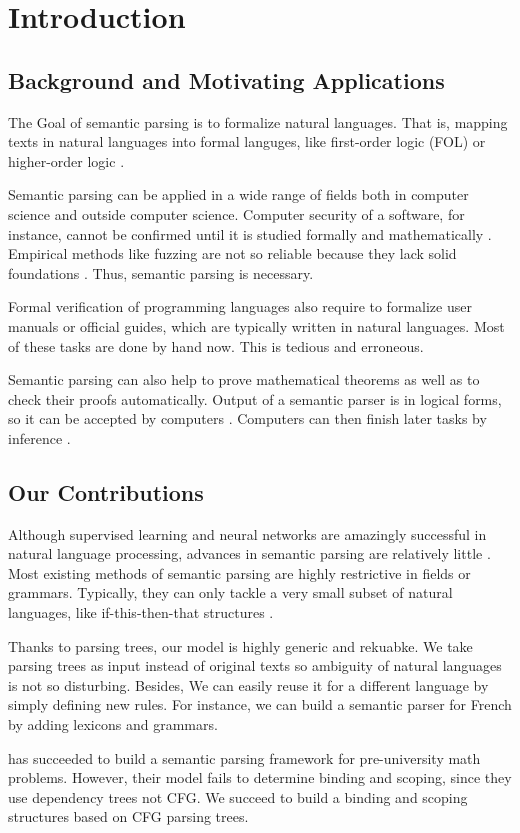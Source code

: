 \documentclass{article}
\begin{document}
\section{Introduction}{
	\subsection{Background and Motivating Applications}{
		The Goal of semantic parsing is to formalize natural languages. That is, mapping texts in natural languages into formal languges, like first-order logic (FOL) or higher-order logic \cite{artzi}. 

		Semantic parsing can be applied in a wide range of fields both in computer science and outside computer science. Computer security of a software, for instance, cannot be confirmed until it is studied formally and mathematically \cite{avalle}\cite{lal}. Empirical methods like fuzzing are not so reliable because they lack solid foundations \cite{moro}. Thus, semantic parsing is necessary. 

		Formal verification of programming languages \cite{jung} also require to formalize user manuals or official guides, which are typically written in natural languages. Most of these tasks are done by hand now. This is tedious and erroneous. 

		Semantic parsing can also help to prove mathematical theorems as well as to check their proofs automatically. Output of a semantic parser is in logical forms, so it can be accepted by computers \cite{matsuzaki}. Computers can then finish later tasks by inference \cite{chang}. 
	}

	\subsection{Our Contributions}{
		Although supervised learning and neural networks are amazingly successful in natural language processing, advances in semantic parsing are relatively little \cite{reddy}. Most existing methods of semantic parsing are highly restrictive in fields \cite{shi} or grammars. Typically, they can only tackle a very small subset of natural languages, like if-this-then-that structures \cite{quirk} \cite{beltagy}. 

		Thanks to parsing trees, our model is highly generic and rekuabke. We take parsing trees as input instead of original texts so ambiguity of natural languages is not so disturbing. Besides, We can easily reuse it for a different language by simply defining new rules. For instance, we can build a semantic parser for French by adding lexicons and grammars. 

		\cite{matsuzaki} has succeeded to build a semantic parsing framework for pre-university math problems. However, their model fails to determine binding and scoping, since they use dependency trees not CFG. We succeed to build a binding and scoping structures based on CFG parsing trees. 
	}
}
\end{document}

